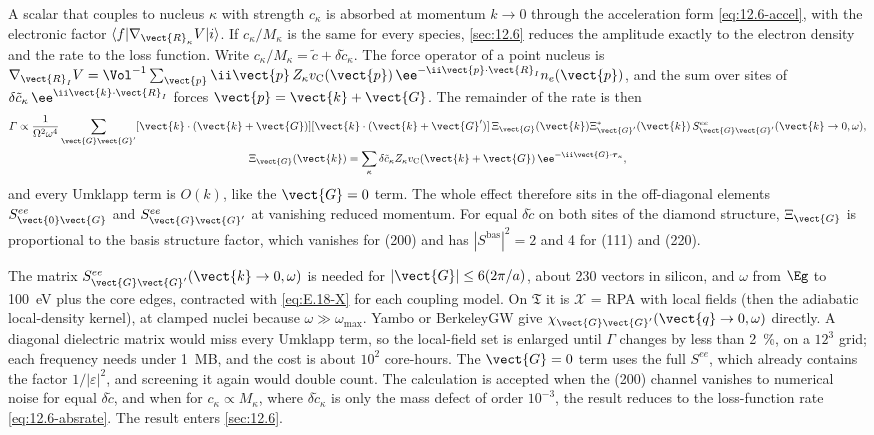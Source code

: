 A scalar that couples to nucleus $\kappa$ with strength $c_\kappa$ is absorbed at momentum $k \to 0$ through the acceleration form \cref{eq:12.6-accel}, with the electronic factor $\langle f|\nabla_{\vect{R}_\kappa}V|i\rangle$. If $c_\kappa/M_\kappa$ is the same for every species, \cref{sec:12.6} reduces the amplitude exactly to the electron density and the rate to the loss function. Write $c_\kappa/M_\kappa = \tilde c + \delta\tilde c_\kappa$. The force operator of a point nucleus is $\nabla_{\vect{R}_I}V = \Vol^{-1}\sum_{\vect{p}}\ii\vect{p}\,Z_\kappa v_{\mathrm{C}}(\vect{p})\,\ee^{-\ii\vect{p}\cdot\vect{R}_I}n_e(\vect{p})$, and the sum over sites of $\delta\tilde c_\kappa\,\ee^{\ii\vect{k}\cdot\vect{R}_I}$ forces $\vect{p} = \vect{k} + \vect{G}$. The remainder of the rate is then
\begin{equation}
  \begin{gathered}
  \varGamma \propto \frac{1}{\Omega^2\omega^4}\sum_{\vect{G}\vect{G}'}[\vect{k}\cdot(\vect{k}+\vect{G})][\vect{k}\cdot(\vect{k}+\vect{G}')]\,
  \Xi_{\vect{G}}(\vect{k})\Xi^*_{\vect{G}'}(\vect{k})\,S^{ee}_{\vect{G}\vect{G}'}(\vect{k}\to0,\omega) ,
  \\
  \Xi_{\vect{G}}(\vect{k}) = \sum_\kappa \delta\tilde c_\kappa Z_\kappa v_{\mathrm{C}}(\vect{k}+\vect{G})\,\ee^{-\ii\vect{G}\cdot\boldsymbol{\tau}_\kappa} ,
  \end{gathered}
  \label{eq:E.18-X}
\end{equation}
and every Umklapp term is $O(k)$, like the $\vect{G} = 0$ term. The whole effect therefore sits in the off-diagonal elements $S^{ee}_{\vect{0}\vect{G}}$ and $S^{ee}_{\vect{G}\vect{G}'}$ at vanishing reduced momentum. For equal $\delta\tilde c$ on both sites of the diamond structure, $\Xi_{\vect{G}}$ is proportional to the basis structure factor, which vanishes for (200) and has $|S^{\mathrm{bas}}|^2 = 2$ and 4 for (111) and (220).

The matrix $S^{ee}_{\vect{G}\vect{G}'}(\vect{k}\to0,\omega)$ is needed for $|\vect{G}| \le 6(2\pi/a)$, about 230 vectors in silicon, and $\omega$ from $\Eg$ to \SI{100}{eV} plus the core edges, contracted with \cref{eq:E.18-X} for each coupling model. On $\mathfrak{T}$ it is $\mathcal{X}$ = RPA with local fields (then the adiabatic local-density kernel), at clamped nuclei because $\omega \gg \omega_{\mathrm{max}}$. Yambo or BerkeleyGW give $\chi_{\vect{G}\vect{G}'}(\vect{q}\to0,\omega)$ directly. A diagonal dielectric matrix would miss every Umklapp term, so the local-field set is enlarged until $\varGamma$ changes by less than \SI{2}{\percent}, on a $12^3$ grid; each frequency needs under \SI{1}{MB}, and the cost is about $10^2$ core-hours. The $\vect{G} = 0$ term uses the full $S^{ee}$, which already contains the factor $1/|\varepsilon|^2$, and screening it again would double count. The calculation is accepted when the (200) channel vanishes to numerical noise for equal $\delta\tilde c$, and when for $c_\kappa \propto M_\kappa$, where $\delta\tilde c_\kappa$ is only the mass defect of order $10^{-3}$, the result reduces to the loss-function rate \cref{eq:12.6-absrate}. The result enters \cref{sec:12.6}.

